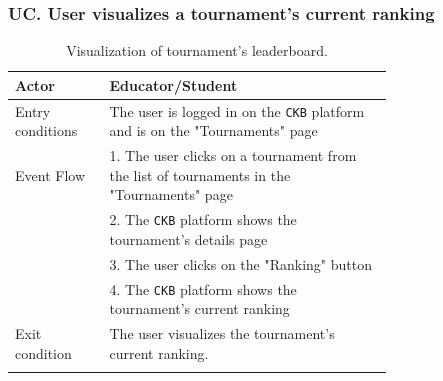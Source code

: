 \subsubsection*{UC\cuc . User visualizes a tournament's current ranking}
\begin{center}
    \begin{longtable}{lp{0.75\linewidth}}
        \hline
        Actor            & Educator/Student \\
        \hline
        Entry conditions & The user is logged in on the \verb|CKB| platform and is on the "Tournaments" page\\
        \hline
        Event Flow      
        & 1. The user clicks on a tournament from the list of tournaments in the "Tournaments" page\\
        & 2. The \verb|CKB| platform shows the tournament's details page\\
        & 3. The user clicks on the "Ranking" button\\
        & 4. The \verb|CKB| platform shows the tournament's current ranking\\
        \hline
        Exit condition   & The user visualizes the tournament's current ranking.   \\ 
        \hline
        \caption{Visualization of tournament's leaderboard.}
        \label{tab: visualization_of_leaderboard_use_case}
    \end{longtable}

\end{center}

